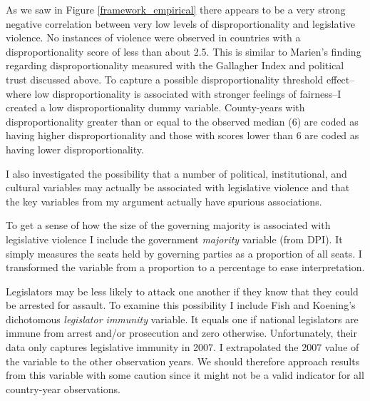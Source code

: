 \documentclass[a4paper]{article}\usepackage[]{graphicx}\usepackage[]{color}
\begin{document}
As we saw in Figure \ref{framework_empirical} there appears to be a very strong negative correlation between very low levels of disproportionality and legislative violence. No instances of violence were observed in countries with a disproportionality score of less than about 2.5. This is similar to Marien's \citeyearpar{Marien2011} finding regarding disproportionality measured with the Gallagher Index and political trust discussed above. To capture a possible disproportionality threshold effect--where low disproportionality is associated with stronger feelings of fairness--I created a low disproportionality dummy variable. County-years with disproportionality greater than or equal to the observed median (6) are coded as having higher disproportionality and those with scores lower than 6 are coded as having lower disproportionality. 

I also investigated the possibility that a number of political, institutional, and cultural variables may actually be associated with legislative violence and that the key variables from my argument actually have spurious associations. 

To get a sense of how the size of the governing majority is associated with legislative violence I include the government {\emph{majority}} variable (from DPI). It simply measures the seats held by governing parties as a proportion of all seats. I transformed the variable from a proportion to a percentage to ease interpretation. 

Legislators may be less likely to attack one another if they know that they could be arrested for assault. To examine this possibility I include Fish and Koening's \citeyearpar{Fish2009} dichotomous \emph{legislator immunity} variable. It equals one if national legislators are immune from arrest and/or prosecution and zero otherwise. Unfortunately, their data only captures legislative immunity in 2007. I extrapolated the 2007 value of the variable to the other observation years. We should therefore approach results from this variable with some caution since it might not be a valid indicator for all country-year observations.
\end{document}

